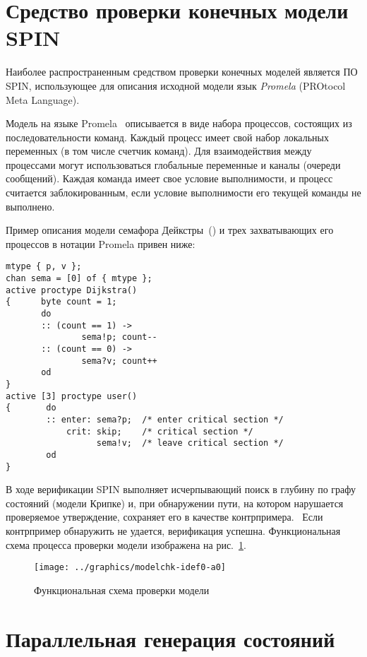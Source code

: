 \documentclass[12pt,a4paper,fleqn]{article}
\begin{document}
\section{Средство проверки конечных модели SPIN}
\label{sec:spin}

Наиболее распространенным средством проверки конечных моделей является ПО SPIN, использующее для описания исходной
модели язык \emph{Promela} (PROtocol Meta Language).~\cite{SpinRoot}

Модель на языке Promela~ описывается в виде набора процессов, состоящих из последовательности команд. Каждый процесс
имеет свой набор локальных переменных (в том числе счетчик команд). Для взаимодействия между процессами могут
использоваться глобальные переменные и каналы (очереди сообщений). Каждая команда имеет свое условие выполнимости, и
процесс считается заблокированным, если условие выполнимости его текущей команды не выполнено.

Пример описания модели семафора Дейкстры~(\cite{SPIN}) и трех захватывающих его процессов в нотации Promela привен ниже:

\begin{lstlisting}[language=Promela]
mtype { p, v };
chan sema = [0] of { mtype };
active proctype Dijkstra()
{      byte count = 1;
       do
       :: (count == 1) ->
               sema!p; count--
       :: (count == 0) ->
               sema?v; count++
       od
}
active [3] proctype user()
{       do
        :: enter: sema?p;  /* enter critical section */
            crit: skip;    /* critical section */
                  sema!v;  /* leave critical section */
        od
}  
\end{lstlisting}

В ходе верификации SPIN выполняет исчерпывающий поиск в глубину по графу состояний (модели Крипке) и, при обнаружении
пути, на котором нарушается проверяемое утверждение, сохраняет его в качестве контрпримера.~\cite{Clarke} Если
контрпример обнаружить не удается, верификация успешна. Функциональная схема процесса проверки модели изображена на
рис.~\ref{fig:modelchk-idef0-a0}.

\begin{figure}[ht]
  \centering
  \texttt{[image: ../graphics/modelchk-idef0-a0]}
  \caption{Функциональная схема проверки модели}
  \label{fig:modelchk-idef0-a0}
\end{figure}

\section{Параллельная генерация состояний}
\label{sec:pargen}
\end{document}
